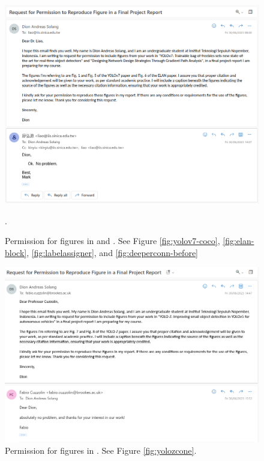 \chapter{}
\label{appendix:license}

\begin{figure}[!h]
  \centering
  \includegraphics[width=\textwidth]{figures/permission-yolov7.png}
  \caption*{Permission  for figures in \textcite{yolov7} and \textcite{elan}. See Figure \ref{fig:yolov7-coco}, \ref{fig:elan-block}, \ref{fig:labelassigner}, and \ref{fig:deeperconn-before}}.
\end{figure}

\begin{figure}[!h]
  \centering
  \includegraphics[width=\textwidth]{figures/permission-yoloz.png}
  \caption*{Permission  for figures in \textcite{yoloz}. See Figure \ref{fig:yolozcone}.}
\end{figure}

